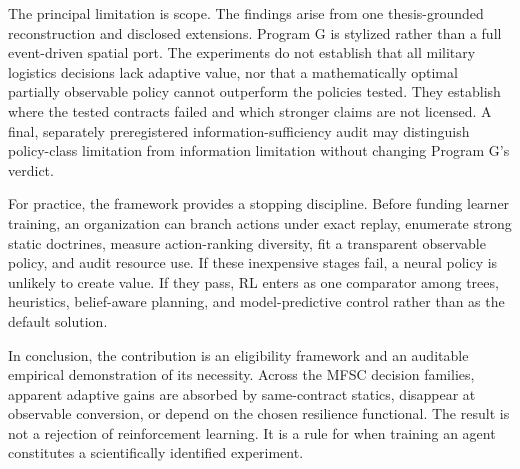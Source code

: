 The principal limitation is scope. The findings arise from one thesis-grounded reconstruction
and disclosed extensions. Program G is stylized rather than a full event-driven spatial port.
The experiments do not establish that all military logistics decisions lack adaptive value,
nor that a mathematically optimal partially observable policy cannot outperform the policies
tested. They establish where the tested contracts failed and which stronger claims are not
licensed. A final, separately preregistered information-sufficiency audit may distinguish
policy-class limitation from information limitation without changing Program G's verdict.

For practice, the framework provides a stopping discipline. Before funding learner training,
an organization can branch actions under exact replay, enumerate strong static doctrines,
measure action-ranking diversity, fit a transparent observable policy, and audit resource use.
If these inexpensive stages fail, a neural policy is unlikely to create value. If they pass,
RL enters as one comparator among trees, heuristics, belief-aware planning, and model-predictive
control rather than as the default solution.

In conclusion, the contribution is an eligibility framework and an auditable empirical
demonstration of its necessity. Across the MFSC decision families, apparent adaptive gains are
absorbed by same-contract statics, disappear at observable conversion, or depend on the chosen
resilience functional. The result is not a rejection of reinforcement learning. It is a rule
for when training an agent constitutes a scientifically identified experiment.
